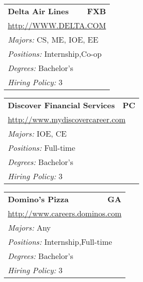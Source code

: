 \documentclass[twoside]{article}
\begin{document}
\begin{center}
\begin{multicols}{3}
\begin{FlushLeft}
\begin{minipage}{.9\columnwidth}
\end{minipage}
 
\begin{minipage}{.9\columnwidth}\begin{tabularx}{.95\columnwidth}{Xr}
                 {\Large\bf Delta Air Lines} & {\Large\bf FXB}\\
    \multicolumn{2}{p{.95\columnwidth}}{\url{http://WWW.DELTA.COM}}\\
    \multicolumn{2}{p{.95\columnwidth}}{\emph{Majors:} CS, ME, IOE, EE}\\
    \multicolumn{2}{p{.95\columnwidth}}{\emph{Positions:} Internship,Co-op}\\
    \multicolumn{2}{p{.95\columnwidth}}{\emph{Degrees:} Bachelor's}\\
    \multicolumn{2}{p{.95\columnwidth}}{\emph{Hiring Policy:} 3}\\
    \end{tabularx}
    
\end{minipage}
 
\begin{minipage}{.9\columnwidth}\begin{tabularx}{.95\columnwidth}{Xr}
                 {\Large\bf Discover Financial Services} & {\Large\bf PC}\\
    \multicolumn{2}{p{.95\columnwidth}}{\url{http://www.mydiscovercareer.com}}\\
    \multicolumn{2}{p{.95\columnwidth}}{\emph{Majors:} IOE, CE}\\
    \multicolumn{2}{p{.95\columnwidth}}{\emph{Positions:} Full-time}\\
    \multicolumn{2}{p{.95\columnwidth}}{\emph{Degrees:} Bachelor's}\\
    \multicolumn{2}{p{.95\columnwidth}}{\emph{Hiring Policy:} 3}\\
    \end{tabularx}
    
\end{minipage}
 
\begin{minipage}{.9\columnwidth}\begin{tabularx}{.95\columnwidth}{Xr}
                 {\Large\bf Domino's Pizza} & {\Large\bf GA}\\
    \multicolumn{2}{p{.95\columnwidth}}{\url{http://www.careers.dominos.com}}\\
    \multicolumn{2}{p{.95\columnwidth}}{\emph{Majors:} Any}\\
    \multicolumn{2}{p{.95\columnwidth}}{\emph{Positions:} Internship,Full-time}\\
    \multicolumn{2}{p{.95\columnwidth}}{\emph{Degrees:} Bachelor's}\\
    \multicolumn{2}{p{.95\columnwidth}}{\emph{Hiring Policy:} 3}\\
    \end{tabularx}
    

\end{minipage}
\end{FlushLeft}
\end{multicols}
\end{center}
\end{document}
